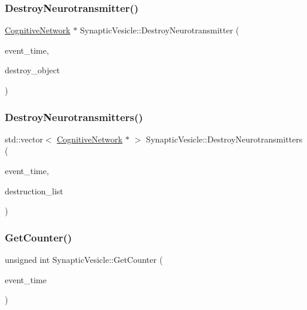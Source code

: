 \subsubsection{\texorpdfstring{Destroy\+Neurotransmitter()}{DestroyNeurotransmitter()}}
{\footnotesize\ttfamily \mbox{\hyperlink{classCognitiveNetwork}{Cognitive\+Network}} $\ast$ Synaptic\+Vesicle\+::\+Destroy\+Neurotransmitter (\begin{DoxyParamCaption}\item[{std\+::chrono\+::time\+\_\+point$<$ \mbox{\hyperlink{universe_8h_a0ef8d951d1ca5ab3cfaf7ab4c7a6fd80}{Clock}} $>$}]{event\+\_\+time,  }\item[{\mbox{\hyperlink{classCognitiveNetwork}{Cognitive\+Network}} $\ast$}]{destroy\+\_\+object }\end{DoxyParamCaption})}

\mbox{\label{classSynapticVesicle_a37817cc68b212d89ef8aa08c73631cbb}} 
\subsubsection{\texorpdfstring{Destroy\+Neurotransmitters()}{DestroyNeurotransmitters()}}
{\footnotesize\ttfamily std\+::vector$<$ \mbox{\hyperlink{classCognitiveNetwork}{Cognitive\+Network}} $\ast$ $>$ Synaptic\+Vesicle\+::\+Destroy\+Neurotransmitters (\begin{DoxyParamCaption}\item[{std\+::chrono\+::time\+\_\+point$<$ \mbox{\hyperlink{universe_8h_a0ef8d951d1ca5ab3cfaf7ab4c7a6fd80}{Clock}} $>$}]{event\+\_\+time,  }\item[{std\+::vector$<$ \mbox{\hyperlink{classCognitiveNetwork}{Cognitive\+Network}} $\ast$$>$}]{destruction\+\_\+list }\end{DoxyParamCaption})}

\mbox{\label{classSynapticVesicle_a42a3ab6704c27ca55531864c46f0fc2b}} 
\subsubsection{\texorpdfstring{Get\+Counter()}{GetCounter()}}
{\footnotesize\ttfamily unsigned int Synaptic\+Vesicle\+::\+Get\+Counter (\begin{DoxyParamCaption}\item[{std\+::chrono\+::time\+\_\+point$<$ \mbox{\hyperlink{universe_8h_a0ef8d951d1ca5ab3cfaf7ab4c7a6fd80}{Clock}} $>$}]{event\+\_\+time }\end{DoxyParamCaption})\hspace{0.3cm}{\ttfamily [inline]}}

